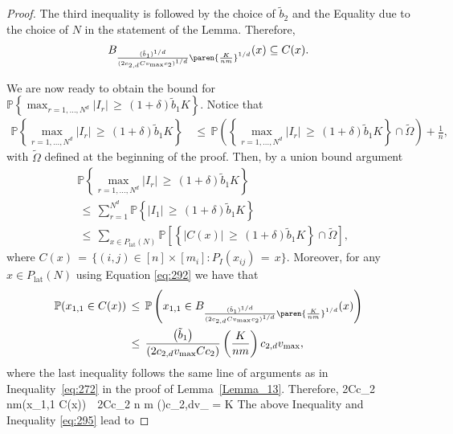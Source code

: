 \documentclass[twoside,11pt]{article}
\begin{document}
\begin{proof}
The third inequality is followed by the choice of \(\tilde{b}_2\) and the Equality due to the choice of \(N\) in the statement of the Lemma. Therefore,
\begin{align}
B_{\frac{(\tilde b_1)^{1/d}}{(2c_{2,d} Cv_{\text{max}}c_2)^{1/d}}\paren{\frac{K}{nm}}^{1/d}}(x) \subseteq  C(x)
 \label{eq:293}.
\end{align}

We are now ready to obtain the bound for \(\mathbb{P} \left\{ \max_{r=1,\ldots,N^d} |I_r| \,\geq\, (1 + \delta)\tilde b_1 K \right\}\). Notice that
\begin{align}
    \mathbb{P} \left\{ \max_{r=1,\ldots,N^d} |I_r| \,\geq\, (1 + \delta)\tilde b_1 K \right\} &\,\leq\, \mathbb{P} \left(\left\{ \max_{r=1,\ldots,N^d} |I_r| \,\geq\, (1 + \delta)\tilde b_1 K \right\} \cap \tilde \Omega \right)  + \frac{1}{n} \label{eq:294},
\end{align}
with \(\tilde \Omega\) defined at the beginning of the proof. Then, by a union bound argument
\begin{align}
    &\mathbb{P} \left\{ \max_{r=1,\ldots,N^d} |I_r| \,\geq\, (1 + \delta)\tilde b_1 K \right\} \\ 
    &\,\leq\, \sum_{r=1}^{N^d} \mathbb{P} \left\{ |I_1| \,\geq\, (1 + \delta)\tilde b_1 K \right\}
    \\&\,\leq\, \sum_{x \in P_{\text{lat}}(N)} \mathbb{P} \left[\left\{ |C(x)| \,\geq\, (1 + \delta)\tilde b_1 K \right\} \cap \tilde \Omega \right] \label{eq:295},
\end{align}
where \(C(x) \,=\, \{(i,j) \in [n] \times [m_i] : P_I(x_{ij}) \,=\, x\}\). Moreover, for any \(x \in P_{\text{lat}}(N)\) using Equation \eqref{eq:292} we have that
\begin{align}
    \mathbb{P}(x_{1,1} \in C(x)) &\,\leq\, \mathbb{P} \left(x_{1,1} \in B_{\frac{(\tilde b_1)^{1/d}}{(2c_{2,d} Cv_{\text{max}}c_2)^{1/d}}\paren{\frac{K}{nm}}^{1/d}}(x) \right) \nonumber \\
    &\,\leq\, \frac{\left(\tilde{b}_1\right)}{\left(2c_{2,d}v_{\text{max}}Cc_2\right)} \left(\frac{K}{nm}\right)c_{2,d}v_{\text{max}},
\end{align}
where the last inequality follows the same line of arguments as in Inequality~\eqref{eq:272} in the proof of Lemma~\ref{Lemma_13}. Therefore, 
\bea 
2Cc_2 nm(x_{1,1} \in C(x)) \,\leq\, 2Cc_2 n m \left(\right)c_{2,d}v_{}  = K 
\bea 
The above Inequality and Inequality \eqref{eq:295} lead to

\end{proof}
\end{document}
